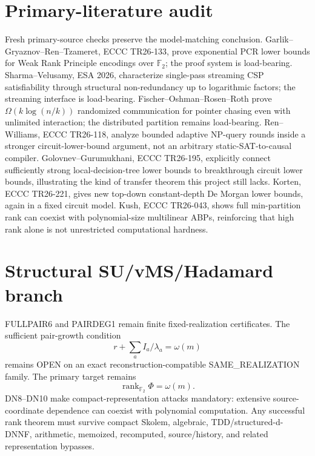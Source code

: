 \documentclass[11pt]{article}
\begin{document}
\section*{Primary-literature audit}
Fresh primary-source checks preserve the model-matching conclusion. Garlik--Gryaznov--Ren--Tzameret, ECCC TR26-133, prove exponential PCR lower bounds for Weak Rank Principle encodings over \(\mathbb F_2\); the proof system is load-bearing. Sharma--Velusamy, ESA 2026, characterize single-pass streaming CSP satisfiability through structural non-redundancy up to logarithmic factors; the streaming interface is load-bearing. Fischer--Oshman--Rosen--Roth prove \(\Omega(k\log(n/k))\) randomized communication for pointer chasing even with unlimited interaction; the distributed partition remains load-bearing. Ren--Williams, ECCC TR26-118, analyze bounded adaptive NP-query rounds inside a stronger circuit-lower-bound argument, not an arbitrary static-SAT-to-causal compiler. Golovnev--Gurumukhani, ECCC TR26-195, explicitly connect sufficiently strong local-decision-tree lower bounds to breakthrough circuit lower bounds, illustrating the kind of transfer theorem this project still lacks. Korten, ECCC TR26-221, gives new top-down constant-depth De Morgan lower bounds, again in a fixed circuit model. Kush, ECCC TR26-043, shows full min-partition rank can coexist with polynomial-size multilinear ABPs, reinforcing that high rank alone is not unrestricted computational hardness.

\section*{Structural SU/vMS/Hadamard branch}
FULLPAIR6 and PAIRDEG1 remain finite fixed-realization certificates. The sufficient pair-growth condition
\[
r+\sum_a I_a/\lambda_a=\omega(m)
\]
remains OPEN on an exact reconstruction-compatible SAME\_REALIZATION family. The primary target remains
\[
\boxed{\operatorname{rank}_{\mathbb F_2}\Phi=\omega(m)}.
\]
DN8--DN10 make compact-representation attacks mandatory: extensive source-coordinate dependence can coexist with polynomial computation. Any successful rank theorem must survive compact Skolem, algebraic, TDD/structured-d-DNNF, arithmetic, memoized, recomputed, source/history, and related representation bypasses.
\end{document}
